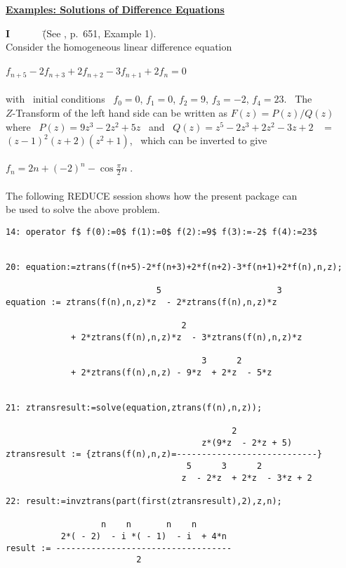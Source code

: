 \underline {{\bf Examples: Solutions of Difference Equations}}
\begin{tabbing}
{\bf I} \ \ \ \ \ \ \= 

  (See \cite{Bronstein:1981}, p.\ 651, Example 1).\\
  \> Consider the \= homogeneous linear difference equation\\ \\
  \>\>  $f_{n+5} - 2 f_{n+3} + 2 f_{n+2} - 3 f_{n+1} + 2 f_{n}=0$\\ \\

  \> with \ initial conditions \ $f_0=0$, $f_1=0$, $f_2=9$, $f_3=-2$,
     $f_4=23$. \  The\\
  \> $Z$-Transform of the left hand side can be written as
     $F(z)=P(z)/Q(z)$ \\
  \> where \ $P(z)=9z^3-2z^2+5z$ \ 
     and \ $Q(z)=z^5-2z^3+2z^2-3z+2$ \ $=$\\ 
  \> $(z-1)^2(z+2)(z^2+1)$, \ which can be inverted to give\\ \\

 \>\>  $f_n = 2n + (-2)^n - \cos \frac{\pi}{2}n\;.$ \\ \\

  \> The following REDUCE session shows how the present package can
\\ \> be used to solve the above problem.

\end{tabbing}
\begin{verbatim}
14: operator f$ f(0):=0$ f(1):=0$ f(2):=9$ f(3):=-2$ f(4):=23$


20: equation:=ztrans(f(n+5)-2*f(n+3)+2*f(n+2)-3*f(n+1)+2*f(n),n,z);

                              5                       3
equation := ztrans(f(n),n,z)*z  - 2*ztrans(f(n),n,z)*z

                                   2
             + 2*ztrans(f(n),n,z)*z  - 3*ztrans(f(n),n,z)*z

                                       3      2
             + 2*ztrans(f(n),n,z) - 9*z  + 2*z  - 5*z


21: ztransresult:=solve(equation,ztrans(f(n),n,z));

                                             2
                                       z*(9*z  - 2*z + 5)
ztransresult := {ztrans(f(n),n,z)=----------------------------}
                                    5      3      2
                                   z  - 2*z  + 2*z  - 3*z + 2

22: result:=invztrans(part(first(ztransresult),2),z,n);

                   n    n       n    n
           2*( - 2)  - i *( - 1)  - i  + 4*n
result := -----------------------------------
                          2

\end{verbatim}


